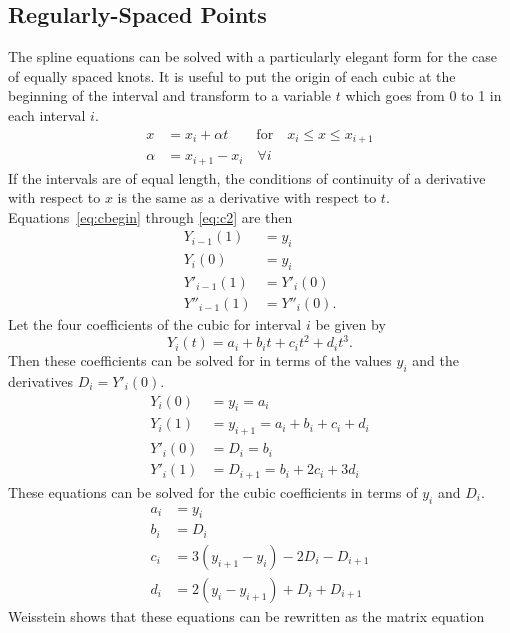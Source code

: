 \documentclass{scrartcl}
\begin{document}
\subsection{Regularly-Spaced Points}

The spline equations can be solved with a particularly elegant
form for the case of equally spaced knots. It is useful to put the
origin of each cubic at the beginning of the interval and transform
to a variable $t$ which goes from 0 to 1 in each interval $i$.
\begin{align}
x &= x_i + \alpha t \qquad\mbox{for}\quad x_i\leq x\leq x_{i+1}\label{eq:xt}\\
\alpha &= x_{i+1}-x_i \quad\forall i \label{eq:alpha}
\end{align}
If the
intervals are of equal length, the conditions of continuity
of a derivative with respect to $x$ is the same as a derivative
with respect to $t$. Equations~\ref{eq:cbegin} through \ref{eq:c2}
are then
\begin{align}
Y_{i-1}(1) &= y_i\\
Y_i(0) &= y_i\\
Y'_{i-1}(1) &= Y'_i(0)\\
Y''_{i-1}(1) &= Y''_i(0).
\end{align}
Let the four coefficients of the cubic for interval $i$ be given
by
\begin{equation}
Y_i(t) = a_i + b_i t + c_i t^2 + d_i t^3 .
\end{equation}
Then these coefficients can be solved for in terms of the
values $y_i$ and the derivatives $D_i = Y'_i(0)$.
\begin{align}
Y_i(0)&=y_i = a_i \label{eq:Yi0}\\
Y_i(1)&=y_{i+1} = a_i + b_i + c_i + d_i\\
Y'_i(0) &= D_i = b_i\\
Y'_i(1) &= D_{i+1} = b_i + 2 c_i + 3 d_i \label{eq:Ypi1}
\end{align}
These equations can be solved for the cubic coefficients in
terms of $y_i$ and $D_i$.
\begin{align}
a_i &= y_i \label{eq:ai}\\
b_i &= D_i\\
c_i &= 3(y_{i+1}-y_i)-2D_i-D_{i+1} \label{eq:ci}\\
d_i &= 2(y_i-y_{i+1})+D_i +D_{i+1} \label{eq:di}
\end{align}
Weisstein shows that these equations can be rewritten as
the matrix equation
\end{document}
